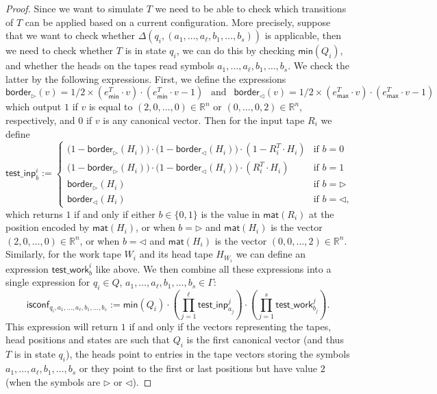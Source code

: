 \begin{proof}
Since we want to simulate $T$ we need to be able to check which 
    transitions of $T$ can be applied based on a current configuration. More precisely,
    suppose that we want to check whether $\Delta(q_i,(a_1,\ldots,a_{\ell},b_1,\ldots, b_s))$ is applicable, then we 
    need to check whether $T$ is in state $q_i$, we can do this by checking 
    $\mathsf{min}(Q_i)$, and whether the heads on the tapes read symbols $a_1,\ldots,a_{\ell},b_1, \ldots, b_s$. We 
    check the latter by the following expressions.
    First, we define the expressions 
    $$
    \mathsf{border}_{\rhd}(v) = 1/2 \times (e_{\mathsf{min}}^T \cdot v) \cdot (e_{\mathsf{min}}^T \cdot v - 1) \ \ \text{ and } \ \  \mathsf{border}_{\lhd}(v) = 1/2 \times (e_{\mathsf{max}}^T \cdot v) \cdot (e_{\mathsf{max}}^T \cdot v - 1)
    $$
    which output $1$ if $v$ is equal to $(2,0,\ldots,0)\in\mathbb{R}^n$ or $(0, \ldots, 0, 2)\in\mathbb{R}^n$, respectively, and $0$ if $v$ is any canonical vector.
    Then for the input tape $R_i$ we define
    $$
    \mathsf{test\_inp}^i_b:=\begin{cases}
    \bigl(1-\mathsf{border}_{\rhd}(H_i)\bigr)\cdot \bigl(1-\mathsf{border}_{\lhd}(H_i)\bigr)\cdot(1- R_i^T\cdot H_i) & \text{if $b=0$}\\
    \bigl(1-\mathsf{border}_{\rhd}(H_i)\bigr)\cdot \bigl(1-\mathsf{border}_{\lhd}(H_i)\bigr)\cdot(R_i^T\cdot H_i) & \text{if $b=1$}\\
    \mathsf{border}_{\rhd}(H_i) & \text{if $b=\rhd$}\\
    \mathsf{border}_{\lhd}(H_i) & \text{if $b=\lhd$},
    \end{cases}
    $$
    which returns $1$ if and only if either $b\in\{0,1\}$ is the value in $\mathsf{mat}(R_i)$ at the 
    position encoded by $\mathsf{mat}(H_i)$, or when $b=\rhd$ and $\mathsf{mat}(H_i)$ is the vector 
    $(2,0,\ldots,0)\in\mathbb{R}^n$, or when $b=\lhd$ and $\mathsf{mat}(H_i)$ is the vector 
    $(0,0,\ldots,2)\in\mathbb{R}^n$.
    Similarly, for the work tape $W_i$ and its head tape $H_{W_i}$ we can define an expression $\mathsf{test\_work}^i_b$ like above.
    We then combine all these expressions into a single expression for $q_i\in Q$, 
    $a_1,\ldots,a_\ell,b_1,\ldots, b_s\in\Gamma$:
    $$
    \mathsf{isconf}_{q_i,a_1,\ldots,a_\ell,b_1,\ldots, b_s}:=
    \mathsf{min}(Q_i)\cdot \left(\prod_{j=1}^{\ell} \mathsf{test\_inp}_{a_j}^j\right)
    \cdot\left(\prod_{j=1}^{s} \mathsf{test\_work}_{b_j}^j\right).
    $$
    This expression will return $1$ if and only if the vectors representing the tapes, 
    head positions and states are such that $Q_i$ is the first canonical vector 
    (and thus $T$ is in state $q_i$), the heads point to entries in the tape vectors storing 
    the symbols $a_1,\ldots,a_{\ell}, b_1, \ldots, b_s$ or they point to the first or last positions but have value $2$ (when the symbols are $\rhd$ or $\lhd$). 


\end{proof}
